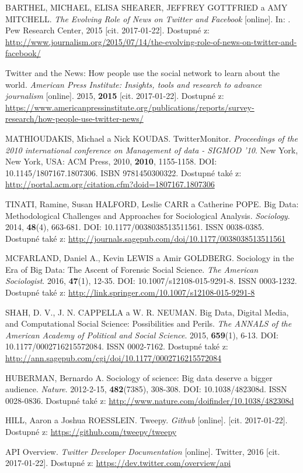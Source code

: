 \documentclass[12pt, a4paper]{article}
\numberwithin{equation}{section} 	%
\begin{document}
\begin{thebibliography}{99}
    BARTHEL, MICHAEL, ELISA SHEARER, JEFFREY GOTTFRIED a AMY MITCHELL. \textit{The Evolving Role of News on Twitter and Facebook} [online]. In: . Pew Research Center, 2015 [cit. 2017-01-22]. Dostupné z: \url{http://www.journalism.org/2015/07/14/the-evolving-role-of-news-on-twitter-and-facebook/}

    Twitter and the News: How people use the social network to learn about the world. \textit{American Press Institute: Insights, tools and research to advance journalism} [online]. 2015, \textbf{2015} [cit. 2017-01-22]. Dostupné z: \url{https://www.americanpressinstitute.org/publications/reports/survey-research/how-people-use-twitter-news/}

    MATHIOUDAKIS, Michael a Nick KOUDAS. TwitterMonitor. \textit{Proceedings of the 2010 international conference on Management of data - SIGMOD '10}. New York, New York, USA: ACM Press, 2010, \textbf{2010}, 1155-1158. DOI: 10.1145/1807167.1807306. ISBN 9781450300322. Dostupné také z: \url{http://portal.acm.org/citation.cfm?doid=1807167.1807306}

    TINATI, Ramine, Susan HALFORD, Leslie CARR a Catherine POPE. Big Data: Methodological Challenges and Approaches for Sociological Analysis. \textit{Sociology}. 2014, \textbf{48}(4), 663-681. DOI: 10.1177/0038038513511561. ISSN 0038-0385. Dostupné také z: \url{http://journals.sagepub.com/doi/10.1177/0038038513511561}

    MCFARLAND, Daniel A., Kevin LEWIS a Amir GOLDBERG. Sociology in the Era of Big Data: The Ascent of Forensic Social Science. \textit{The American Sociologist}. 2016, \textbf{47}(1), 12-35. DOI: 10.1007/s12108-015-9291-8. ISSN 0003-1232. Dostupné také z: \url{http://link.springer.com/10.1007/s12108-015-9291-8}

    SHAH, D. V., J. N. CAPPELLA a W. R. NEUMAN. Big Data, Digital Media, and Computational Social Science: Possibilities and Perils. \textit{The ANNALS of the American Academy of Political and Social Science}. 2015, \textbf{659}(1), 6-13. DOI: 10.1177/0002716215572084. ISSN 0002-7162. Dostupné také z: \url{http://ann.sagepub.com/cgi/doi/10.1177/0002716215572084}

    HUBERMAN, Bernardo A. Sociology of science: Big data deserve a bigger audience. \textit{Nature}. 2012-2-15, \textbf{482}(7385), 308-308. DOI: 10.1038/482308d. ISSN 0028-0836. Dostupné také z: \url{http://www.nature.com/doifinder/10.1038/482308d}

    HILL, Aaron a Joshua ROESSLEIN. Tweepy. \textit{Github} [online]. [cit. 2017-01-22]. Dostupné z: \url{https://github.com/tweepy/tweepy}

    API Overview. \textit{Twitter Developer Documentation} [online]. Twitter, 2016 [cit. 2017-01-22]. Dostupné z: \url{https://dev.twitter.com/overview/api}
\end{thebibliography}
\end{document}
